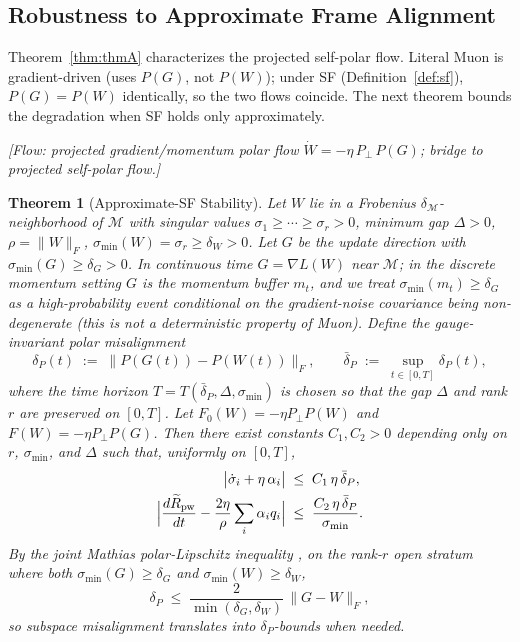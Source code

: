 \documentclass{article}
\newtheorem{theorem}{Theorem}
\begin{document}
\subsection{Robustness to Approximate Frame Alignment}
\label{sec:theory:robust}

Theorem~\ref{thm:thmA} characterizes the projected self-polar flow. Literal Muon is gradient-driven (uses $P(G)$, not $P(W)$); under \textsf{SF} (Definition~\ref{def:sf}), $P(G)=P(W)$ identically, so the two flows coincide. The next theorem bounds the degradation when \textsf{SF} holds only approximately.

\noindent\textit{[Flow: projected gradient/momentum polar flow $\dot W = -\eta\,P_\perp\,P(G)$; bridge to projected self-polar flow.]}

\begin{theorem}[Approximate-\textsf{SF} Stability]
\label{thm:robust}
Let $W$ lie in a Frobenius $\delta_{\mathcal M}$-neighborhood of $\mathcal M$ with singular values $\sigma_1\geq\cdots\geq\sigma_r>0$, minimum gap $\Delta>0$, $\rho=\|W\|_F$, $\sigma_{\min}(W)=\sigma_r\geq\delta_W>0$. Let $G$ be the update direction with $\sigma_{\min}(G)\geq\delta_G>0$. In continuous time $G=\nabla L(W)$ near $\mathcal M$; in the discrete momentum setting $G$ is the momentum buffer $m_t$, and we treat $\sigma_{\min}(m_t)\geq\delta_G$ as a high-probability event conditional on the gradient-noise covariance being non-degenerate (this is not a deterministic property of Muon). Define the gauge-invariant polar misalignment
\[
\delta_P(t) \;:=\; \|P(G(t))-P(W(t))\|_F,
\qquad
\bar\delta_P \;:=\; \sup_{t\in[0,T]} \delta_P(t),
\]
where the time horizon $T = T(\bar\delta_P,\Delta,\sigma_{\min})$ is chosen so that the gap $\Delta$ and rank $r$ are preserved on $[0,T]$. Let $F_0(W)=-\eta P_\perp P(W)$ and $F(W)=-\eta P_\perp P(G)$. Then there exist constants $C_1,C_2>0$ depending only on $r$, $\sigma_{\min}$, and $\Delta$ such that, uniformly on $[0,T]$,
\begin{align}
\bigl|\dot\sigma_i + \eta\,\alpha_i\bigr| &\;\leq\; C_1\,\eta\,\bar\delta_P, \label{eq:robust_sv}\\
\Bigl|\frac{d\widetilde R_{\mathrm{pw}}}{dt} - \frac{2\eta}{\rho}\sum_i\alpha_i q_i\Bigr| &\;\leq\; \frac{C_2\,\eta\,\bar\delta_P}{\sigma_{\min}}. \label{eq:robust_shape}
\end{align}
By the joint Mathias polar-Lipschitz inequality \citep{mathias1993polar}, on the rank-$r$ open stratum where both $\sigma_{\min}(G)\geq\delta_G$ and $\sigma_{\min}(W)\geq\delta_W$,
\[
\delta_P \;\leq\; \frac{2}{\min(\delta_G,\delta_W)}\,\|G-W\|_F,
\]
so subspace misalignment translates into $\delta_P$-bounds when needed.
\end{theorem}
\end{document}
